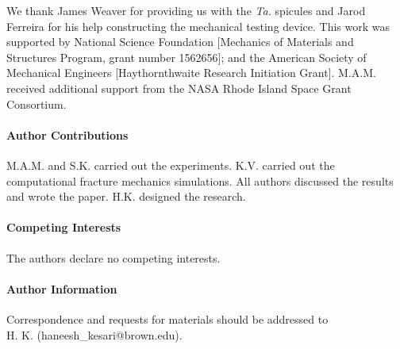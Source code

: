 \documentclass[12pt,onecolumn]{article}
\makeatletter
\newcommand{\TA}{\textit{Ta.\@}\xspace}
\makeatother
\begin{document}
We thank James Weaver for providing us with the \TA spicules and Jarod Ferreira for his help constructing the mechanical testing device. This work was supported by National Science Foundation [Mechanics of Materials and Structures Program, grant number 1562656]; and the American Society of Mechanical Engineers [Haythornthwaite Research Initiation Grant]. M.A.M. received additional support from the NASA Rhode Island Space Grant Consortium.


\paragraph{Author Contributions} M.A.M. and S.K. carried out the experiments.  K.V. carried out the computational fracture mechanics simulations. All authors discussed the results and wrote the paper. H.K. designed the research.

\paragraph{Competing Interests} The authors declare no competing interests.


\paragraph{Author Information} Correspondence and requests for materials should be addressed to \\ H. K. (haneesh\_kesari@brown.edu).





\end{document}
